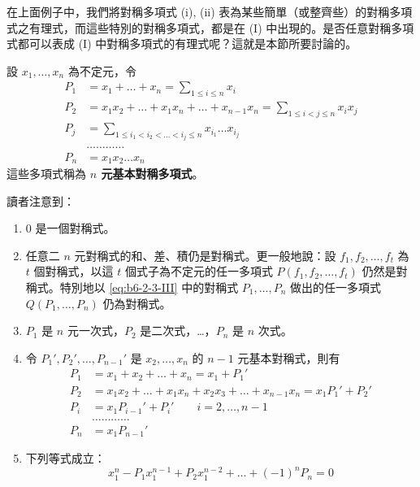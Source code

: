 在上面例子中，我們將對稱多項式 (i), (ii) 表為某些簡單（或整齊些）的對稱多項式之有理式，而這些特別的對稱多項式，都是在 (I) 中出現的。是否任意對稱多項式都可以表成 (I) 中對稱多項式的有理式呢？這就是本節所要討論的。

設 $x_1, \dots, x_n$ 為不定元，令
\begin{equation}
\begin{aligned}
P_1 &= x_1 + \dots + x_n = \sum_{1 \le i \le n} x_i \\
P_2 &= x_1 x_2 + \dots + x_1 x_n + \dots + x_{n-1} x_n = \sum_{1 \le i < j \le n} x_i x_j \\
P_j &= \sum_{1 \le i_1 < i_2 < \dots < i_j \le n} x_{i_1}\dots x_{i_j} \\
&\dots\dots\dots\dots \\
P_n &= x_1 x_2 \dots x_n
\end{aligned} \tag{III} \label{eq:b6-2-3-III}
\end{equation}
這些多項式稱為 \textbf{$n$ 元基本對稱多項式}。

讀者注意到：
\begin{enumerate}[label=(\arabic*), leftmargin=2em]
  \item 0 是一個對稱式。
  \item 任意二 $n$ 元對稱式的和、差、積仍是對稱式。更一般地說：設 $f_1, f_2, \dots, f_t$ 為 $t$ 個對稱式，以這 $t$ 個式子為不定元的任一多項式 $P(f_1, f_2, \dots, f_t)$ 仍然是對稱式。特別地以 \eqref{eq:b6-2-3-III} 中的對稱式 $P_1, \dots, P_n$ 做出的任一多項式 $Q(P_1, \dots, P_n)$ 仍為對稱式。
  \item $P_1$ 是 $n$ 元一次式，$P_2$ 是二次式，\dots，$P_n$ 是 $n$ 次式。
  \item 令 $P_1', P_2', \dots, P_{n-1}'$ 是 $x_2, \dots, x_n$ 的 $n-1$ 元基本對稱式，則有
  \begin{equation}
  \begin{aligned}
  P_1 &= x_1 + x_2 + \dots + x_n = x_1 + P_1' \\
  P_2 &= x_1 x_2 + \dots + x_1 x_n + x_2 x_3 + \dots + x_{n-1} x_n = x_1 P_1' + P_2' \\
  P_i &= x_1 P_{i-1}' + P_i' \qquad i=2, \dots, n-1 \\
  &\dots\dots\dots\dots \\
  P_n &= x_1 P_{n-1}'
  \end{aligned} \tag{IV} \label{eq:b6-2-3-IV}
  \end{equation}
  \item 下列等式成立：
  \begin{equation}
  x_1^n - P_1 x_1^{n-1} + P_2 x_1^{n-2} + \dots + (-1)^n P_n = 0 \tag{V} \label{eq:b6-2-3-V}
  \end{equation}
\end{enumerate}

